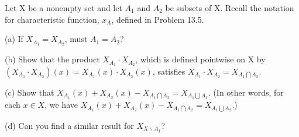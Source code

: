 \documentclass[11pt, a4paper, UTF8]{ctexart}
\begin{document}
\begin{problem}[UD:16.22]
Let X be a nonempty set and let \(A_{1}\) and \(A_{2}\) be subsets of X. Recall the notation for characteristic function, \(x_{A}\), defined in Problem 13.5. 

(a) If \(X_{A_{1}} = X_{A_{2}}\), must \(A_{1} = A_{2}\)?

(b) Show that the product \(X_{A_{1}} \cdot X_{A_{2}}\), which is defined pointwise on X by \((X_{A_{1}} \cdot X_{A_{2}})(x) = X_{A_{1}}(x) \cdot X_{A_{2}}(x)\), satisfies \(X_{A_{1}} \cdot X_{A_{2}} = X_{A_{1} \bigcap A_{2}}\).

(c) Show that \(X_{A_{1}}(x) + X_{A_{2}}(x) - X_{A_{1} \bigcap A_{2}} = X_{A_{1} \bigcup A_{2}}\). (In other words, for each \(x \in X\), we have \(X_{A_{1}}(x) + X_{A_{2}}(x) - X_{A_{1} \bigcap A_{2}} = X_{A_{1} \bigcup A_{2}}\).)

(d) Can you find a similar result for \(X_{X \backslash A_{1}}\)?
\end{problem}
\end{document}

